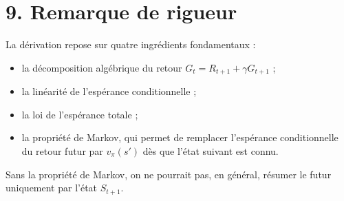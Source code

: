 \documentclass[11pt,a4paper]{article}
\begin{document}
\section*{9. Remarque de rigueur}

La dérivation repose sur quatre ingrédients fondamentaux :
\begin{itemize}[leftmargin=2em]
    \item la décomposition algébrique du retour $G_t = R_{t+1}+\gamma G_{t+1}$ ;
    \item la linéarité de l'espérance conditionnelle ;
    \item la loi de l'espérance totale ;
    \item la propriété de Markov, qui permet de remplacer l'espérance conditionnelle du retour futur par $v_\pi(s')$ dès que l'état suivant est connu.
\end{itemize}

Sans la propriété de Markov, on ne pourrait pas, en général, résumer le futur uniquement par l'état $S_{t+1}$.
\end{document}

